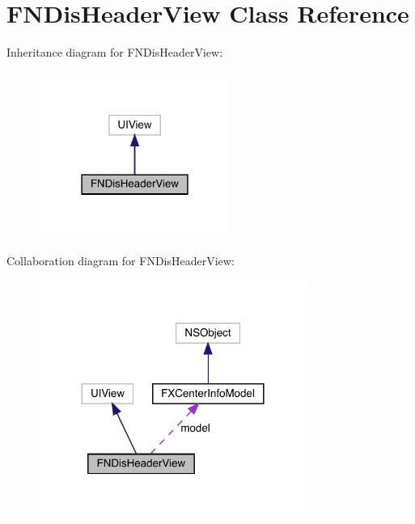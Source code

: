 \hypertarget{interface_f_n_dis_header_view}{}\section{F\+N\+Dis\+Header\+View Class Reference}
\label{interface_f_n_dis_header_view}


Inheritance diagram for F\+N\+Dis\+Header\+View\+:\nopagebreak
\begin{figure}[H]
\begin{center}
\leavevmode
\includegraphics[width=178pt]{interface_f_n_dis_header_view__inherit__graph}
\end{center}
\end{figure}


Collaboration diagram for F\+N\+Dis\+Header\+View\+:\nopagebreak
\begin{figure}[H]
\begin{center}
\leavevmode
\includegraphics[width=248pt]{interface_f_n_dis_header_view__coll__graph}
\end{center}
\end{figure}
